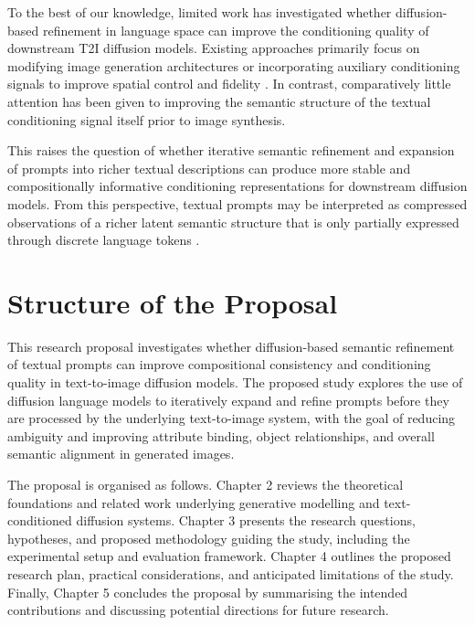 \documentclass[a4paper,twoside,12pt]{report}
\begin{document}
To the best of our knowledge, limited work has investigated whether diffusion-based refinement in language space can improve the conditioning quality of downstream T2I diffusion models. Existing approaches primarily focus on modifying image generation architectures or incorporating auxiliary conditioning signals to improve spatial control and fidelity \citep{hertz2022prompt, zhang2023controlnet, mou2023t2iadapter, saharia2022imagen}. In contrast, comparatively little attention has been given to improving the semantic structure of the textual conditioning signal itself prior to image synthesis.

This raises the question of whether iterative semantic refinement and expansion of prompts into richer textual descriptions can produce more stable and compositionally informative conditioning representations for downstream diffusion models. From this perspective, textual prompts may be interpreted as compressed observations of a richer latent semantic structure that is only partially expressed through discrete language tokens \citep{li2022diffusionlm, austin2021structured}.
\section*{Structure of the Proposal}

This research proposal investigates whether diffusion-based semantic refinement of textual prompts can improve compositional consistency and conditioning quality in text-to-image diffusion models. The proposed study explores the use of diffusion language models to iteratively expand and refine prompts before they are processed by the underlying text-to-image system, with the goal of reducing ambiguity and improving attribute binding, object relationships, and overall semantic alignment in generated images.

The proposal is organised as follows. Chapter 2 reviews the theoretical foundations and related work underlying generative modelling and text-conditioned diffusion systems. Chapter 3 presents the research questions, hypotheses, and proposed methodology guiding the study, including the experimental setup and evaluation framework. Chapter 4 outlines the proposed research plan, practical considerations, and anticipated limitations of the study. Finally, Chapter 5 concludes the proposal by summarising the intended contributions and discussing potential directions for future research.
\end{document}
